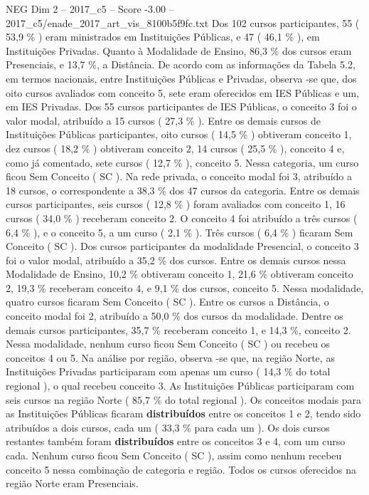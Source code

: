 \begin{textsample}{NEG Dim 2 – 2017\_c5 – Score -3.00 – 2017\_c5/enade\_2017\_art\_vis\_8100b5f9fc.txt}
Dos 102 cursos participantes, 55 ( 53,9 \% ) eram ministrados em Instituições Públicas, e 47 ( 46,1 \% ), em Instituições Privadas.
Quanto à Modalidade de Ensino, 86,3 \% dos cursos eram Presenciais, e 13,7 \%, a Distância.
De acordo com as informações da Tabela 5.2, em termos nacionais, entre Instituições Públicas e Privadas, observa -se que, dos oito cursos avaliados com conceito 5, sete eram oferecidos em IES Públicas e um, em IES Privadas.
Dos 55 cursos participantes de IES Públicas, o conceito 3 foi o valor modal, atribuído a 15 cursos ( 27,3 \% ).
Entre os demais cursos de Instituições Públicas participantes, oito cursos ( 14,5 \% ) obtiveram conceito 1, dez cursos ( 18,2 \% ) obtiveram conceito 2, 14 cursos ( 25,5 \% ), conceito 4 e, como já comentado, sete cursos ( 12,7 \% ), conceito 5.
Nessa categoria, um curso ficou Sem Conceito ( SC ).
Na rede privada, o conceito modal foi 3, atribuído a 18 cursos, o correspondente a 38,3 \% dos 47 cursos da categoria.
Entre os demais cursos participantes, seis cursos ( 12,8 \% ) foram avaliados com conceito 1, 16 cursos ( 34,0 \% ) receberam conceito 2.
O conceito 4 foi atribuído a três cursos ( 6,4 \% ), e o conceito 5, a um curso ( 2,1 \% ).
Três cursos ( 6,4 \% ) ficaram Sem Conceito ( SC ).
Dos cursos participantes da modalidade Presencial, o conceito 3 foi o valor modal, atribuído a 35,2 \% dos cursos.
Entre os demais cursos nessa Modalidade de Ensino, 10,2 \% obtiveram conceito 1, 21,6 \% obtiveram conceito 2, 19,3 \% receberam conceito 4, e 9,1 \% dos cursos, conceito 5.
Nessa modalidade, quatro cursos ficaram Sem Conceito ( SC ).
Entre os cursos a Distância, o conceito modal foi 2, atribuído a 50,0 \% dos cursos da modalidade.
Dentre os demais cursos participantes, 35,7 \% receberam conceito 1, e 14,3 \%, conceito 2.
Nessa modalidade, nenhum curso ficou Sem Conceito ( SC ) ou recebeu os conceitos 4 ou 5.
Na análise por região, observa -se que, na região Norte, as Instituições Privadas participaram com apenas um curso ( 14,3 \% do total regional ), o qual recebeu conceito 3.
As Instituições Públicas participaram com seis cursos na região Norte ( 85,7 \% do total regional ).
Os conceitos modais para as Instituições Públicas ficaram \textbf{distribuídos} entre os conceitos 1 e 2, tendo sido atribuídos a dois cursos, cada um ( 33,3 \% para cada um ).
Os dois cursos restantes também foram \textbf{distribuídos} entre os conceitos 3 e 4, com um curso cada.
Nenhum curso ficou Sem Conceito ( SC ), assim como nenhum recebeu conceito 5 nessa combinação de categoria e região.
Todos os cursos oferecidos na região Norte eram Presenciais.

\end{textsample}
